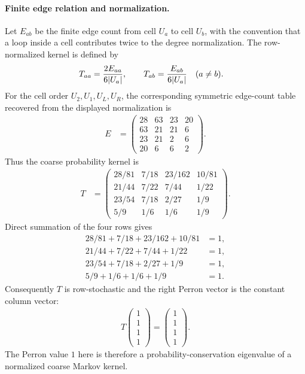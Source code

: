 \paragraph{Finite edge relation and normalization.}
Let $E_{ab}$ be the finite edge count from cell $U_a$ to cell $U_b$, with the convention that a loop inside a cell contributes twice to the degree normalization.  The row-normalized kernel is defined by
$$
\begin{aligned}
T_{aa}&={2E_{aa}\over 6|U_a|},\qquad
T_{ab}={E_{ab}\over 6|U_a|}\quad(a\ne b).
\end{aligned}
$$
For the cell order $U_2,U_1,U_L,U_R$, the corresponding symmetric edge-count table recovered from the displayed normalization is
$$
\begin{aligned}
E&=\begin{pmatrix}
28&63&23&20\\
63&21&21&6\\
23&21&2&6\\
20&6&6&2
\end{pmatrix}.
\end{aligned}
$$
Thus the coarse probability kernel is
$$
\begin{aligned}
T&=\begin{pmatrix}
28/81&7/18&23/162&10/81\\
21/44&7/22&7/44&1/22\\
23/54&7/18&2/27&1/9\\
5/9&1/6&1/6&1/9
\end{pmatrix}.
\end{aligned}
$$
Direct summation of the four rows gives
$$
\begin{aligned}
28/81+7/18+23/162+10/81&=1,\\
21/44+7/22+7/44+1/22&=1,\\
23/54+7/18+2/27+1/9&=1,\\
5/9+1/6+1/6+1/9&=1.
\end{aligned}
$$
Consequently $T$ is row-stochastic and the right Perron vector is the constant column vector:
$$
\begin{aligned}
T\begin{pmatrix}1\\1\\1\\1\end{pmatrix}
=\begin{pmatrix}1\\1\\1\\1\end{pmatrix}.
\end{aligned}
$$
The Perron value $1$ here is therefore a probability-conservation eigenvalue of a normalized coarse Markov kernel.

